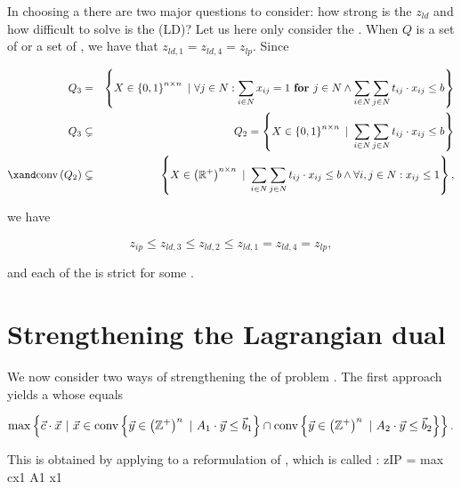 In choosing a  there are two major questions to consider: how strong is the  $z_{ld}$ and how difficult to solve is the  (LD)? Let us here only consider the . When $Q$ is a set of  or a set of , we have that $z_{ld,1}=z_{ld,4}=z_{lp}$. Since

\begin{eqnarray}
Q_3&=&\condset{X\in\accl{0,1}^{n\times n}}{\forall j\in N:\sumdomain[i]{N}{x_{ij}}=1\xfor j\in N\wedge\sumdomain[i]{N}{\sumdomain[j]{N}{t_{ij}\cdot x_{ij}}}\leq b}\\
Q_3&\subsetneq&Q_2=\condset{X\in\accl{0,1}^{n\times n}}{\sumdomain[i]{N}{\sumdomain[j]{N}{t_{ij}\cdot x_{ij}}}\leq b}\\
\xand\funm{conv}{Q_2}&\subsetneq&\condset{X\in\brak{\RRR^+}^{n\times n}}{\sumdomain[i]{N}{\sumdomain[j]{N}{t_{ij}\cdot x_{ij}}}\leq b\wedge\forall i,j\in N:x_{ij}\leq 1},
\end{eqnarray}

we have

\begin{equation}
z_{ip}\leq z_{ld,3}\leq z_{ld,2}\leq z_{ld,1}=z_{ld,4}=z_{lp},
\end{equation}

and each of the  is strict for some .

\section{Strengthening the Lagrangian dual}

We now consider two ways of strengthening the  of problem . The first approach yields a  whose  equals

\begin{equation}
\max\left\{ \vec{c}\cdot\vec{x}\ |\ \vec{x}\in\mbox{conv}\left\{ \vec{y}\in\left( \mathbb{Z}^+ \right)^n\ |\ A_1\cdot\vec{y}\leq\vec{b}_1 \right\}\cap\mbox{conv}\left\{ \vec{y}\in\left( \mathbb{Z}^+ \right)^n\ |\ A_2\cdot\vec{y}\leq\vec{b}_2 \right\} \right\}.
\end{equation}

This  is obtained by applying  to a reformulation of , which is called :
zIP = max cx1
A1 x1

